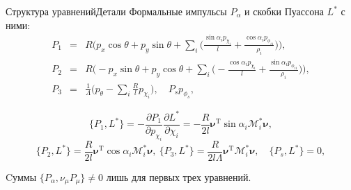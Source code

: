 \documentclass{beamer}
\newcommand\ddfrac[2]{\displaystyle\frac{\displaystyle #1}{\displaystyle #2}}
\newcommand\vsp[1][10]{\\[#1pt]}
\newcommand\M[0]{\mathcal{M}} %
\renewcommand{\vec}[1]{\boldsymbol{\mathbf{#1}}}
\begin{document}
\begin{frame}{Структура уравнений}{Детали}
Формальные импульсы $P_\alpha$ и скобки Пуассона $L^{*}$ с ними:
\begin{equation*}\label{P}
    \begin{array}{rcl}
        P_1 & = & R\bigg(p_x\cos\theta + p_y\sin\theta + \sum\limits_{i}\bigg(\ddfrac{\sin\alpha_ip_{\chi_i}}{l} +  \ddfrac{\cos\alpha_ip_{\phi_{i1}}}{\rho_i}\bigg)\bigg),\vsp
        P_2 & = & R\bigg(-p_x\sin\theta + p_y\cos\theta + \sum\limits_{i}\bigg(-\ddfrac{\cos\alpha_ip_{\chi_i}}{l} +  \ddfrac{\sin\alpha_ip_{\phi_{i1}}}{\rho_i}\bigg)\bigg),\vsp
        P_3 & = & \ddfrac{1}{\Lambda}\bigg(p_\theta - \sum\limits_{i}\ddfrac{R}{l}p_{\chi_i}\bigg), \quad P_s p_{\phi_s},
    \end{array}
\end{equation*}

$$
\{P_1, L^*\} = -\frac{\partial P_1}{\partial p_{\chi_i}}\frac{\partial L^*}{\partial \chi_i} = -\frac{R}{2l}\vec{\nu}^\mathrm{T}\sin\alpha_i\M^*_i\vec{\nu},
$$
$$
\{P_2, L^*\} = \frac{R}{2l}\vec{\nu}^\mathrm{T}\cos\alpha_i\M^*_i\vec{\nu},\  
\{P_3, L^*\} = \frac{R}{2l\Lambda}\vec{\nu}^\mathrm{T}\M^*_i\vec{\nu},\quad \{P_s,L^*\} = 0,
$$

Cуммы $\{P_\alpha, \nu_\mu P_\mu\} \neq 0$ лишь для первых трех уравнений.
\end{frame}
\end{document}
